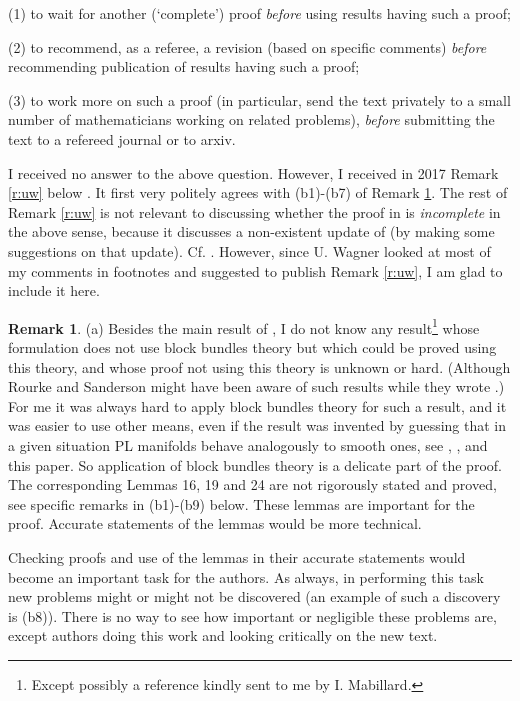 \documentclass[12pt]{article}
\theoremstyle{plain}
\theoremstyle{definition}
\newtheorem{Remark}[Theorem]{Remark}
\begin{document}
{(1) to wait for another (`complete') proof {\it before} using results having such a proof;

(2) to recommend, as a referee, a revision (based on specific comments) {\it before} recommending publication of  results having such a proof;

(3) to work more on such a proof (in particular, send the text privately to a small number of mathematicians working on related problems), {\it before} submitting the text to a refereed journal or to arxiv.

I received no answer to the above question.
However, I received in 2017 Remark \ref{r:uw} below \cite{Sk17o}.
It first very politely agrees with (b1)-(b7) of Remark \ref{r:sp}.
The rest of Remark \ref{r:uw} is not relevant to discussing whether the proof in \cite{MW16} is {\it incomplete} in the above sense, because it discusses a non-existent update of \cite{MW16} (by making some suggestions on that update).
Cf. \cite[Remark 2.3.abcd]{Sk21d}.
However, since U. Wagner looked at most of my comments in footnotes and suggested to publish Remark \ref{r:uw},
I am glad to include it here.

\begin{Remark}\label{r:sp}
(a) Besides the main result of \cite{MW16}, I do not know any result\footnote{Except possibly a reference kindly sent to me by I. Mabillard.}
whose formulation does not use block bundles theory \cite{RS68} but which could be proved using this theory, and whose proof not using this theory is unknown or hard.
(Although Rourke and Sanderson might have been aware of such results while they wrote \cite{RS68}.)
For me it was always hard to apply block bundles theory for such a result, and it was easier to use other means,
even if the result was invented by guessing that in a given situation PL manifolds behave analogously to smooth
ones, see \cite[\S4]{Sk02}, \cite[Remark 21]{MW16},
\cite{CS} and this paper.
So application of block bundles theory is a delicate part of the proof.
The corresponding Lemmas 16, 19 and 24 \cite{MW16} are not rigorously stated and proved, see specific remarks
in (b1)-(b9) below.
These lemmas are important for  the proof.
Accurate statements of the lemmas would be more technical.

Checking proofs and use of the lemmas in their accurate statements would become an important task
for the authors.
As always, in performing this task new problems might or might not be discovered
(an example of such a discovery is (b8)).
There is no way to see how important or negligible these problems are, except authors doing this work and looking critically on the new text.


\end{Remark}}
\end{document}
